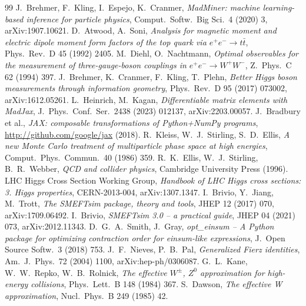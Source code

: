 \documentclass[11pt]{article}
\begin{document}
\begin{thebibliography}{99}
 J.~Brehmer, F.~Kling, I.~Espejo, K.~Cranmer, \emph{MadMiner: machine learning-based inference for particle physics}, Comput.\ Softw.\ Big Sci.\ 4 (2020) 3, arXiv:1907.10621.
 D.~Atwood, A.~Soni, \emph{Analysis for magnetic moment and electric dipole moment form factors of the top quark via $e^+e^-\to t\bar t$}, Phys.\ Rev.\ D 45 (1992) 2405.
 M.~Diehl, O.~Nachtmann, \emph{Optimal observables for the measurement of three-gauge-boson couplings in $e^+e^-\to W^+W^-$}, Z.\ Phys.\ C 62 (1994) 397.
 J.~Brehmer, K.~Cranmer, F.~Kling, T.~Plehn, \emph{Better Higgs boson measurements through information geometry}, Phys.\ Rev.\ D 95 (2017) 073002, arXiv:1612.05261.
 L.~Heinrich, M.~Kagan, \emph{Differentiable matrix elements with MadJax}, J.\ Phys.\ Conf.\ Ser.\ 2438 (2023) 012137, arXiv:2203.00057.
 J.~Bradbury et al., \emph{JAX: composable transformations of Python+NumPy programs}, \url{http://github.com/google/jax} (2018).
 R.~Kleiss, W.~J.~Stirling, S.~D.~Ellis, \emph{A new Monte Carlo treatment of multiparticle phase space at high energies}, Comput.\ Phys.\ Commun.\ 40 (1986) 359.
 R.~K.~Ellis, W.~J.~Stirling, B.~R.~Webber, \emph{QCD and collider physics}, Cambridge University Press (1996).
 LHC Higgs Cross Section Working Group, \emph{Handbook of LHC Higgs cross sections: 3. Higgs properties}, CERN-2013-004, arXiv:1307.1347.
 I.~Brivio, Y.~Jiang, M.~Trott, \emph{The SMEFTsim package, theory and tools}, JHEP 12 (2017) 070, arXiv:1709.06492.
 I.~Brivio, \emph{SMEFTsim 3.0 -- a practical guide}, JHEP 04 (2021) 073, arXiv:2012.11343.
 D.~G.~A.~Smith, J.~Gray, \emph{opt\_einsum -- A Python package for optimizing contraction order for einsum-like expressions}, J.\ Open Source Softw.\ 3 (2018) 753.
 J.~F.~Nieves, P.~B.~Pal, \emph{Generalized Fierz identities}, Am.\ J.\ Phys.\ 72 (2004) 1100, arXiv:hep-ph/0306087.
 G.~L.~Kane, W.~W.~Repko, W.~B.~Rolnick, \emph{The effective $W^\pm$, $Z^0$ approximation for high-energy collisions}, Phys.\ Lett.\ B 148 (1984) 367.
 S.~Dawson, \emph{The effective W approximation}, Nucl.\ Phys.\ B 249 (1985) 42.
\end{thebibliography}
\end{document}

